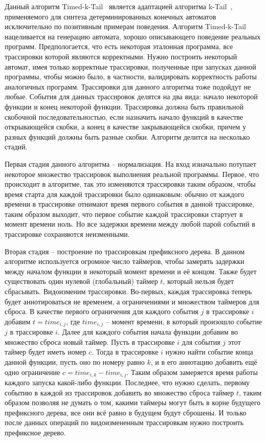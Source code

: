 \documentclass[times,specification,annotation]{itmo-student-thesis}
\begin{document}
Данный алгоритм Timed-k-Tail~\cite{timed-k-tail} является адаптацией алгоритма k-Tail~\cite{k-tail}, применяемого для синтеза детерминированных конечных автоматов 
исключительно по позитивным примерам поведения. 
Алгоритм Timed-k-Tail нацеливается на генерацию автомата, хорошо описывающего поведение реальных программ. Предпологается, что есть некоторая эталонная программа, 
все трассировки которой являются корректными. Нужно построить некоторый автомат, имея только корректные трассировки, полученные при запусках данной программы, чтобы
можно было, в частности, валидировать корректность работы аналогичных программ. Трассировки для данного алгоритма тоже подойдут не любые.
События для данных трассировок делятся на два вида: начало некоторой функции и конец некоторой функции. Трассировка должна быть правильной скобочной последовательностью, если назначить 
начало функций в качестве открывающейся скобки, а конец в качестве закрывающейся скобки, причем у разных функций должны быть разные скобки.
Алгоритм делится на несколько стадий.

Первая стадия данного алгоритма -- нормализация. На вход изначально потупает некоторое множество трассировок выполнения реальной программы. Первое, что происходит в алгоритме,
так это изменяются трассировки таким образом, чтобы время старта для каждой трассировки было одинаковым: обычно от каждого времени в трассировке отнимают время первого события
в данной трассировке, таким образом выходит, что первое событие каждой трассировки стартует в момент времени ноль. Но все задержки времени между любой парой событий в трассировке
сохраняются неизменными. 

Вторая стадия -- построение по трассировкам префиксного дерева. В данном алгоритме используется огромное число таймеров, чтобы замерять задержки между началом функции в некоторый
момент времени и её концом. Также будет существовать один нулевой (глобальный) таймер $t$, который нельзя будет сбрасывать. Видоизменим трассировки. 
Во-первых, каждая трассировка теперь будет аннотироваться не временем, а ограничениями и множеством таймеров для сброса. В качестве первого ограничения для каждого события $j$ в трассировке $i$
добавим $t = time_{i, j}$, где $time_{i, j}$ -- момент времени, в который произошло событие $j$ в трассировке $i$. Далее для каждого события начала функции добавим во множество сброса новый
таймер. Пусть в трассировке $i$ для события $j$ этот таймер будет иметь номер $c$. Тогда в трассировке $i$ нужно найти событие конца данной функции, пусть оно по номеру равно $k$, и в его
аннотацию добавить ещё одно ограничение $c = time_{i, k} - time_{i, j}$. Таким образом замеряется время работы каждого запуска какой-либо функции. Последнее, что нужно сделать,
первому событию в каждой из трассировок добавить во множество сброса таймер $t$, таким образом позволяя не думать о том, какими таймеры могут быть в корне будущего префиксного дерева, все они всё равно
в будущем будут сброшены. И только после данных операций по видоизмененным трассировкам нужно построить префиксное дерево.
\end{document}
